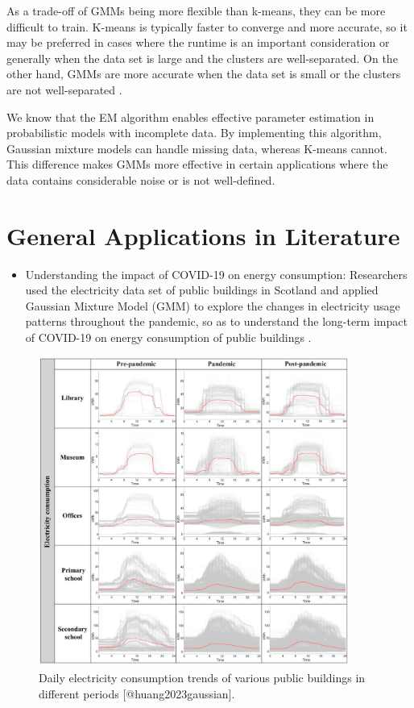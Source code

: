 \documentclass[12pt]{article}
\providecommand{\tightlist}{%
  \setlength{\itemsep}{0pt}\setlength{\parskip}{0pt}}
\begin{document}
As a trade-off of GMMs being more flexible than k-means, they can be
more difficult to train. K-means is typically faster to converge and
more accurate, so it may be preferred in cases where the runtime is an
important consideration or generally when the data set is large and the
clusters are well-separated. On the other hand, GMMs are more accurate
when the data set is small or the clusters are not well-separated
\citep{kumar2022gaussian}.

We know that the EM algorithm enables effective parameter estimation in
probabilistic models with incomplete data. By implementing this
algorithm, Gaussian mixture models can handle missing data, whereas
K-means cannot. This difference makes GMMs more effective in certain
applications where the data contains considerable noise or is not
well-defined.

\hypertarget{general-applications-in-literature}{%
\section{General Applications in
Literature}\label{general-applications-in-literature}}

\label{sec:examples}

\begin{itemize}
\tightlist
\item
  Understanding the impact of COVID-19 on energy consumption:
  Researchers used the electricity data set of public buildings in
  Scotland and applied Gaussian Mixture Model (GMM) to explore the
  changes in electricity usage patterns throughout the pandemic, so as
  to understand the long-term impact of COVID-19 on energy consumption
  of public buildings \citep{huang2023gaussian}.
\end{itemize}

\begin{figure}[htbp] 
\centering 
\includegraphics[width=4in]{1.jpg} 
\caption{Daily electricity consumption trends of various public buildings in different periods [@huang2023gaussian].}
\end{figure}
\end{document}

